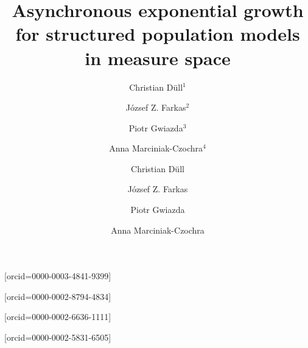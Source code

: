\documentclass[12pt,a4paper]{amsart}
\begin{document}
\title[Asynchronous exponential growth in measure spaces]{Asynchronous exponential growth for structured population models in measure space}

\author[C. D\"{u}ll]{Christian D\"{u}ll$^1$}
\author[J. Z. Farkas]{J\'{o}zsef Z. Farkas$^2$}
\author[P. Gwiazda]{Piotr Gwiazda$^3$}
\author[A. Marciniak-Czochra]{Anna Marciniak-Czochra$^4$}

\address[$^1$]{Institute for Mathematics, Heidelberg University, 69120 Heidelberg, Germany}
\address[$^2$]{Departament de Matem\`{a}tiques, Universitat Aut\`{o}noma de Barcelona, Bellaterra, 08193, Spain}
\address[$^3$]{Institute of Applied Mathematics and Mechanics,  University of Warsaw, Warszawa 02-097, Poland}
\address[$^4$]{Institute for Mathematics and Interdisciplinary Center for Scientific Computing (IWR), Heidelberg University, 69120 Heidelberg, Germany}

\date{}
\iffalse
\author[1]{Christian D\"{u}ll}[orcid=0000-0003-4841-9399]

\author[2]{J\'{o}zsef Z. Farkas}[orcid=0000-0002-8794-4834]

\author[3]{Piotr Gwiazda}[orcid=0000-0002-6636-1111]

\author[1,4]{Anna Marciniak-Czochra}[orcid=0000-0002-5831-6505]
\cormark[1]






\end{document}
